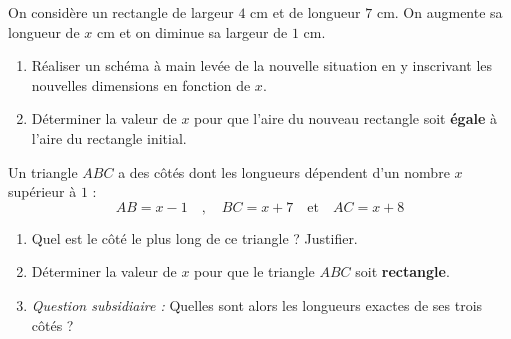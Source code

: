 \documentclass[a4paper]{book}
\begin{document}
    \begin{exercice}
        On considère un rectangle de largeur $4\text{ cm}$ et de longueur $7\text{ cm}$. 
        On augmente sa longueur de $x\text{ cm}$ et on diminue sa largeur de $1\text{ cm}$.
        
        \noindent
        \begin{minipage}{0.5\textwidth}
            \begin{enumerate}
                \item Réaliser un schéma à main levée de la nouvelle situation en y inscrivant les nouvelles dimensions en fonction de $x$.
                \item Déterminer la valeur de $x$ pour que l'aire du nouveau rectangle soit \textbf{égale} à l'aire du rectangle initial.
            \end{enumerate}
        \end{minipage}
        \hfill
        \begin{minipage}{0.45\textwidth}
            \centering
        \end{minipage}
    \end{exercice}


    \begin{exercice}
        Un triangle $ABC$ a des côtés dont les longueurs dépendent d'un nombre $x$ supérieur à $1$ :
        $$ AB = x - 1 \quad , \quad BC = x + 7 \quad \text{et} \quad AC = x + 8 $$
        
        \begin{enumerate}
            \item Quel est le côté le plus long de ce triangle ? Justifier.
            \item Déterminer la valeur de $x$ pour que le triangle $ABC$ soit \textbf{rectangle}.
            \item \textit{Question subsidiaire :} Quelles sont alors les longueurs exactes de ses trois côtés ?
        \end{enumerate}
    \end{exercice}
\end{document}
